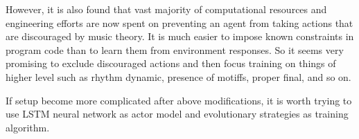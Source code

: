 \documentclass{article}
\begin{document}
However, it is also found that vast majority of computational resources and engineering efforts are now spent on preventing an agent from taking actions that are discouraged by music theory. It is much easier to impose known constraints in program code than to learn them from environment responses. So it seems very promising to exclude discouraged actions and then focus training on things of higher level such as rhythm dynamic, presence of motiffs, proper final, and so on.

If setup become more complicated after above modifications, it is worth trying to use LSTM neural network as actor model and evolutionary strategies as training algorithm.


  

\end{document}
